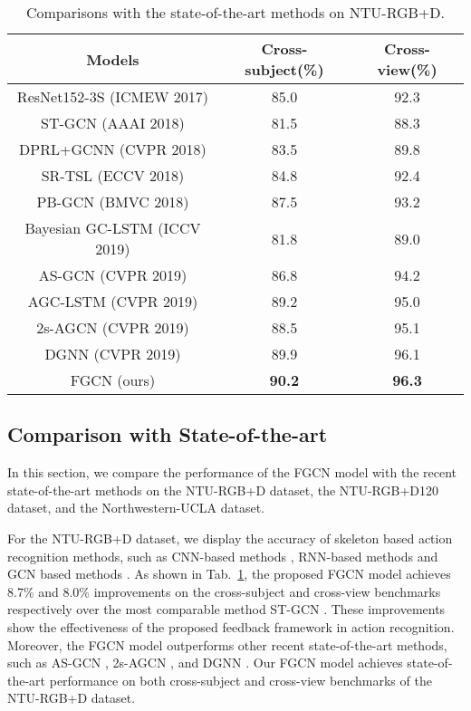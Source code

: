 \documentclass[runningheads]{llncs}
\begin{document}
\begin{table}[t]
	\caption{Comparisons with the state-of-the-art methods on NTU-RGB+D.}
	\label{tab-state-rgbd}
	\tabcolsep=6pt
	\centering
	\begin{tabular}{ccc}
		\hline
		Models & Cross-subject(\%) & Cross-view(\%) \\
		\hline		
		ResNet152-3S (ICMEW 2017) \cite{li2017skeleton}	&85.0	&92.3 \\
		ST-GCN (AAAI 2018) \cite{yan2018spatial}	&81.5	&88.3 \\
		DPRL+GCNN (CVPR 2018) \cite{tang2018deep}	&83.5	&89.8 \\
		SR-TSL (ECCV 2018) \cite{si2018skeleton}	&84.8	&92.4 \\
		PB-GCN (BMVC 2018) \cite{thakkar2018part}	&87.5	&93.2 \\
		Bayesian GC-LSTM (ICCV 2019) \cite{zhao2019bayesian}	&81.8	&89.0 \\
		AS-GCN (CVPR 2019) \cite{li2019actional}	&86.8	&94.2 \\
		AGC-LSTM (CVPR 2019) \cite{si2019attention}	&89.2	&95.0 \\
		2s-AGCN (CVPR 2019) \cite{shi2019two}	&88.5	&95.1 \\
		DGNN (CVPR 2019) \cite{shi2019skeleton}	&89.9	&96.1 \\	
		\hline
		FGCN (ours)	&\textbf{90.2}	&\textbf{96.3} \\
		\hline
	\end{tabular}
\end{table}

\vspace{-1mm}
\subsection{Comparison with State-of-the-art}

In this section, we compare the performance of the FGCN model with the recent state-of-the-art methods on the NTU-RGB+D dataset, the NTU-RGB+D120 dataset, and the Northwestern-UCLA dataset.

For the NTU-RGB+D dataset, we display the accuracy of skeleton based action recognition methods, such as CNN-based methods \cite{li2017skeleton}, RNN-based methods \cite{si2018skeleton,si2019attention,zhao2019bayesian} and GCN based methods \cite{li2019actional,shi2019skeleton,shi2019two,yan2018spatial}. As shown in Tab.~\ref{tab-state-rgbd}, the proposed FGCN model achieves 8.7\% and 8.0\% improvements on the cross-subject and cross-view benchmarks respectively over the most comparable method ST-GCN \cite{yan2018spatial}. These improvements show the effectiveness of the proposed feedback framework in action recognition. Moreover, the FGCN model outperforms other recent state-of-the-art methods, such as AS-GCN \cite{si2019attention}, 2s-AGCN \cite{shi2019two}, and DGNN \cite{shi2019skeleton}. Our FGCN model achieves state-of-the-art performance on both cross-subject and cross-view benchmarks of the NTU-RGB+D dataset.
\end{document}
